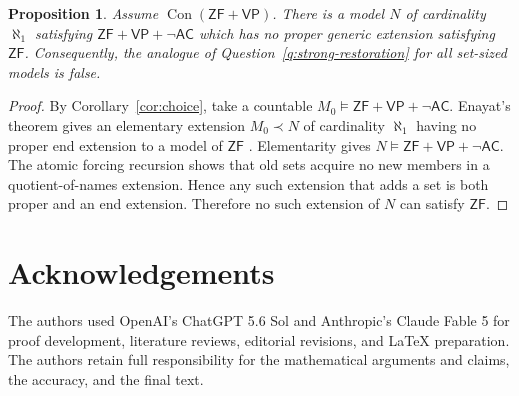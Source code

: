 \documentclass[11pt,a4paper]{amsart}
\newcommand{\VP}{\mathsf{VP}}
\newcommand{\AC}{\mathsf{AC}}
\newcommand{\ZF}{\mathsf{ZF}}
\newcommand{\Con}{\operatorname{Con}}
\theoremstyle{plain}
\newtheorem{proposition}[theorem]{Proposition}
\theoremstyle{definition}
\theoremstyle{remark}
\begin{document}
\begin{proposition}\label{prop:countability-essential}
Assume $\Con(\ZF+\VP)$.  There is a model $N$ of cardinality $\aleph_1$ satisfying $\ZF+\VP+\neg\AC$ which has no proper generic extension satisfying $\ZF$.  Consequently, the analogue of Question~\ref{q:strong-restoration} for all set-sized models is false.
\end{proposition}

\begin{proof}
By Corollary~\ref{cor:choice}, take a countable $M_0\models\ZF+\VP+\neg\AC$.  Enayat's theorem gives an elementary extension $M_0\prec N$ of cardinality $\aleph_1$ having no proper end extension to a model of $\ZF$ \cite[Theorem~5.18]{Enayat}.  Elementarity gives $N\models\ZF+\VP+\neg\AC$.  {The atomic forcing recursion shows that old sets acquire no new members in a quotient-of-names extension.  Hence any such extension that adds a set is both proper and an end extension.}  Therefore no such extension of $N$ can satisfy $\ZF$.
\end{proof}
\endgroup

\section*{Acknowledgements}

{The authors used OpenAI's ChatGPT 5.6 Sol and Anthropic's Claude Fable 5 for proof development, literature reviews, editorial revisions, and LaTeX preparation.  The authors retain full responsibility for the mathematical arguments and claims, the accuracy, and the final text.}
\end{document}
